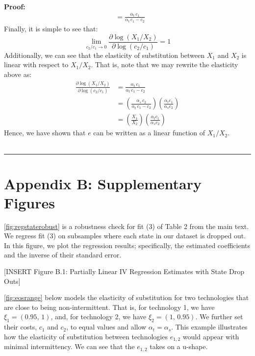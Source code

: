 \documentclass[11pt,a4paper,leqno]{extarticle}
\newenvironment{proof}[1][Proof]{\noindent\textbf{#1:} }{\ \rule{0.5em}{0.5em}}
\begin{document}
\begin{proof}
\begin{align*}
		&= 
		\frac{\alpha _{t}\,c_{1} }{\alpha _{t}\,c_{1} - c_2}
		\end{align*}
		Finally, it is simple to see that:
		$$ \lim_{c_2/c_1 \to 0} \frac{\partial \log(X_1/X_2)}{\partial \log(c_2/c_1)} = 1$$
		Additionally, we can see that the elasticity of substitution between $X_1$ and $X_2$ is linear with respect to $X_1/X_2$. That is, note that we may rewrite the elasticity above as:
		\begin{align*}
		\frac{\partial \log(X_1/X_2)}{\partial \log(c_2/c_1)} &= \frac{\alpha _{t}\,c_{1} }{\alpha _{t}\,c_{1} - c_2}\\
		&= \left( \frac{\alpha _{s}\,c_{2} }{\alpha _{t}\,c_{1} - c_2} \right) \left( \frac{ \alpha_t c_1 }{ \alpha_s c_2 } \right)\\
		&= \left( \frac{X_1}{X_2} \right) \left( \frac{ \alpha_t c_1  }{\alpha_s c_2 } \right)
		\end{align*}
		Hence, we have shown that $e$ can be written as a linear function of $X_1/X_2$. 
		\\ \hfill
	\end{proof}
	
	
	\pagebreak
	
	
	
	
	
	\section{Appendix B: Supplementary Figures}
	\label{sec:AppendixB}
	
	\autoref{fig:regstaterobust} is a robustness check for fit (3) of Table 2 from the main text. We regress fit (3) on subsamples where each state in our dataset is dropped out. In this figure, we plot the regression results; specifically, the estimated coefficients and the inverse of their standard error. 
	
	\vspace{0.15in}
	\begin{center}
		[INSERT Figure B.1: Partially Linear IV Regression Estimates with State Drop Outs]
	\end{center}
	\vspace{0.15in}
	
	
	\autoref{fig:eosrange} below models the elasticity of substitution for two technologies that are close to being non-intermittent. That is, for technology 1, we have $\xi_1 = (0.95,\, 1)$, and, for technology 2, we have $\xi_2 = (1, \,0.95)$. We further set their costs, $c_1$ and $c_2$, to equal values and allow $\alpha_t = \alpha_s$. This example illustrates how the elasticity of substitution between technologies $e_{1,2}$ would appear with minimal intermittency. We can see that the $e_{1,2}$ takes on a u-shape. 
	
\end{document}
